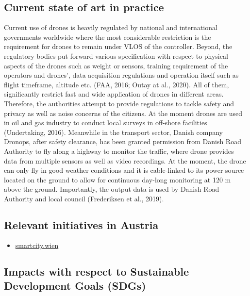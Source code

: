 \documentclass[
]{book}
\providecommand{\tightlist}{%
  \setlength{\itemsep}{0pt}\setlength{\parskip}{0pt}}
\begin{document}
\hypertarget{current-state-of-art-in-practice-6}{%
\subsection*{Current state of art in practice}\label{current-state-of-art-in-practice-6}}

Current use of drones is heavily regulated by national and international governments worldwide where the most considerable restriction is the requirement for drones to remain under VLOS of the controller. Beyond, the regulatory bodies put forward various specification with respect to physical aspects of the drones such as weight or sensors, training requirement of the operators and drones', data acquisition regulations and operation itself such as flight timeframe, altitude etc. (FAA, 2016; Outay at al., 2020). All of them, significantly restrict fast and wide application of drones in different areas. Therefore, the authorities attempt to provide regulations to tackle safety and privacy as well as noise concerns of the citizens. At the moment drones are used in oil and gas industry to conduct local surveys in off-shore facilities (Undertaking, 2016). Meanwhile in the transport sector, Danish company Dronops, after safety clearance, has been granted permission from Danish Road Authority to fly along a highway to monitor the traffic, where drone provides data from multiple sensors as well as video recordings. At the moment, the drone can only fly in good weather conditions and it is cable-linked to its power source located on the ground to allow for continuous day-long monitoring at 120 m above the ground. Importantly, the output data is used by Danish Road Authority and local council (Frederiksen et al., 2019).

\hypertarget{relevant-initiatives-in-austria-6}{%
\subsection*{Relevant initiatives in Austria}\label{relevant-initiatives-in-austria-6}}

\begin{itemize}
\tightlist
\item
  \href{https://smartcity.wien.gv.at/site/en/smart-inspection/}{smartcity.wien}
\end{itemize}

\hypertarget{impacts-with-respect-to-sustainable-development-goals-sdgs-6}{%
\subsection*{Impacts with respect to Sustainable Development Goals (SDGs)}\label{impacts-with-respect-to-sustainable-development-goals-sdgs-6}}
\end{document}
